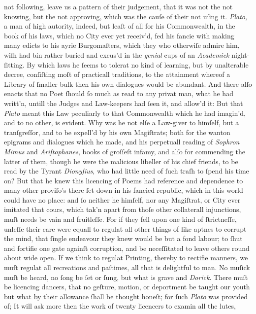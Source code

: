 not following, leave us a pattern of their judgement, that it was not the not
knowing, but the not approving, which was the cauſe of their not uſing it.
\textit{Plato}, a man of high autority, indeed, but leaſt of all for his
Commonwealth, in the book of his laws, which no City ever yet receiv'd, fed his
fancie with making many edicts to his ayrie Burgomaſters, which they who
otherwiſe admire him, wiſh had bin rather buried and excus'd in the
\textit{genial} cups of an \textit{Academick} night-ſitting.  By which laws he
ſeems to tolerat no kind of learning, but by unalterable decree, conſiſting moſt
of practicall traditions, to the attainment whereof a Library of ſmaller bulk
then his own dialogues would be abundant.  And there alſo enacts that no Poet
ſhould ſo much as read to any privat man, what he had writt'n, untill the Judges
and Law-keepers had ſeen it, and allow'd it: But that \textit{Plato} meant this
Law peculiarly to that Commonwealth which he had imagin'd, and to no other, is
evident.  Why was he not elſe a Law-giver to himſelf, but a tranſgreſſor, and to
be expell'd by his own Magiſtrats; both for the wanton epigrams and dialogues
which he made, and his perpetuall reading of \textit{Sophron Mimus} and
\textit{Ariſtophanes}, books of groſſeſt infamy, and alſo for commending the
latter of them, though he were the malicious libeller of his chief friends, to
be read by the Tyrant \textit{Dionyſius}, who had little need of ſuch traſh to
ſpend his time on?  But that he knew this licencing of Poems had reference and
dependence to many other proviſo's there ſet down in his fancied republic, which
in this world could have no place: and ſo neither he himſelf, nor any Magiſtrat,
or City ever imitated that cours, which tak'n apart from thoſe other collaterall
injunctions, muſt needs be vain and fruitleſſe.  For if they fell upon one kind
of ſtrictneſſe, unleſſe their care were equall to regulat all other things of
like aptnes to corrupt the mind, that ſingle endeavour they knew would be but a
fond labour; to ſhut and fortifie one gate againſt corruption, and be
neceſſitated to leave others round about wide open.  If we think to regulat
Printing, thereby to rectifie manners, we muſt regulat all recreations and
paſtimes, all that is delightful to man.  No muſick muſt be heard, no ſong be
ſet or ſung, but what is grave and \textit{Dorick}.  There muſt be licencing
dancers, that no geſture, motion, or deportment be taught our youth but what by
their allowance ſhall be thought honeſt; for ſuch \textit{Plato} was provided
of; It will ask more then the work of twenty licencers to examin all the lutes,

